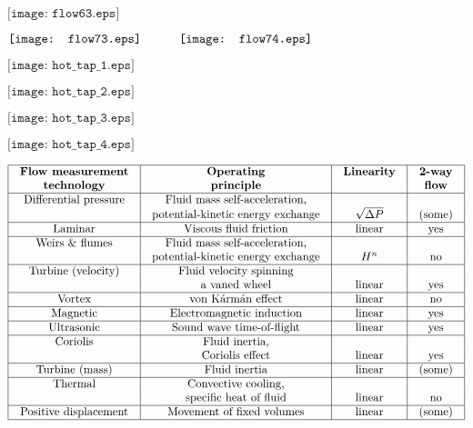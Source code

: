 \documentclass[12pt,a4paper,margin=2cm]{book}
\def\lthtmlcheckvsize{\ifdim\ht\sizebox<\vsize 
  \ifdim\wd\sizebox<\hsize\expandafter\hfill\fi \expandafter\vfill
  \else\expandafter\vss\fi}%
\begin{document}
{\newpage\clearpage
{}%
$\displaystyle \texttt{[image: flow63.eps]}$%
\lthtmlindisplaymathZ
\lthtmlcheckvsize\clearpage}

{\newpage\clearpage
{}%
$\displaystyle \texttt{[image: flow73.eps]} \hskip 30pt \texttt{[image: flow74.eps]}$%
\lthtmlindisplaymathZ
\lthtmlcheckvsize\clearpage}

{\newpage\clearpage
{}%
$\displaystyle \texttt{[image: hot\_tap\_1.eps]}$%
\lthtmlindisplaymathZ
\lthtmlcheckvsize\clearpage}

{\newpage\clearpage
{}%
$\displaystyle \texttt{[image: hot\_tap\_2.eps]}$%
\lthtmlindisplaymathZ
\lthtmlcheckvsize\clearpage}

{\newpage\clearpage
{}%
$\displaystyle \texttt{[image: hot\_tap\_3.eps]}$%
\lthtmlindisplaymathZ
\lthtmlcheckvsize\clearpage}

{\newpage\clearpage
{}%
$\displaystyle \texttt{[image: hot\_tap\_4.eps]}$%
\lthtmlindisplaymathZ
\lthtmlcheckvsize\clearpage}

{\newpage\clearpage
{}%
$\displaystyle \vbox{\offinterlineskip
\halign{\strut
\vrule \quad\hfil # \  \hfil & 
\vrule \quad\hfil # \  \hfil & 
\vrule \quad\hfil # \  \hfil & 
\vrule \quad\hfil # \  \hfil \vrule \cr
\noalign{\hrule }
\textbf{Flow measurement} & \textbf{Operating} & \textbf{Linearity} & \textbf{2-way} \cr
\textbf{technology} & \textbf{principle} &   & \textbf{flow} \cr
\noalign{\hrule }
Differential pressure & Fluid mass self-acceleration, & &  \cr
 & potential-kinetic energy exchange & $\sqrt{\Delta P}$  & (some) \cr
\noalign{\hrule }
Laminar & Viscous fluid friction & linear & yes \cr
\noalign{\hrule }
Weirs \& flumes & Fluid mass self-acceleration, &  &  \cr
 & potential-kinetic energy exchange & $H^n$  & no \cr
\noalign{\hrule }
Turbine (velocity) & Fluid velocity spinning &  & \cr
 & a vaned wheel & linear & yes \cr
\noalign{\hrule }
Vortex & von K\'arm\'an effect & linear & no \cr
\noalign{\hrule }
Magnetic & Electromagnetic induction & linear & yes \cr
\noalign{\hrule }
Ultrasonic & Sound wave time-of-flight & linear & yes \cr
\noalign{\hrule }
Coriolis & Fluid inertia, &  & \cr
 & Coriolis effect & linear & yes \cr
\noalign{\hrule }
Turbine (mass) & Fluid inertia & linear & (some) \cr
\noalign{\hrule }
Thermal & Convective cooling, &  & \cr
 & specific heat of fluid & linear & no \cr
\noalign{\hrule }
Positive displacement & Movement of fixed volumes & linear & (some) \cr
\noalign{\hrule }
} %
}$%
\lthtmlindisplaymathZ
\lthtmlcheckvsize\clearpage}
\end{document}
